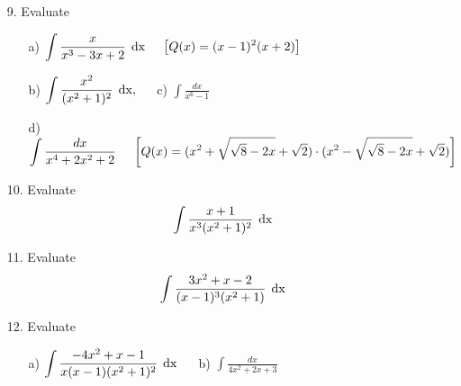 \documentclass[12pt]{article}
\begin{document}
\begin{enumerate}
\item[9.] Evaluate
	\begin{enumerate}	
	
	\item[a)] $\displaystyle
					\int
					\frac{x}
						{x^3-3x+2} \hspace*{1ex}
					\mathrm{dx}			
					\hspace*{3ex} 					        												\left[
						Q(x)=(x-1)^2(x+2)
					\right]$\\

	\item[b)] $\displaystyle
					\int
					\frac
						{x^2}{(x^2+1)^2}
					\hspace*{1ex}
					\mathrm{dx}, 	
					\hspace*{3ex}$ 
					c) 
					$ \displaystyle
				 			\int
							\frac
								{dx}{x^6-1} $\\
	
	\item[d)] $\displaystyle
					\int
					\frac
						{dx}{x^4+2x^2+2} 
					\hspace*{3ex} 
					\left[ 		
						Q(x)=
							(x^2+\sqrt{\sqrt{8}-2x}+\sqrt{2})														\cdot 							
							(x^2-\sqrt{\sqrt{8}-2x}+\sqrt{2})
					\right]$ \\
	\end{enumerate}

\item[10.] Evaluate
	 $$\displaystyle
	 		\int
	 		\frac
	 			{x+1}{x^3(x^2+1)^2}
			\hspace*{1ex}
	 		\mathrm{dx}$$

\item[11.] Evaluate
	$$\displaystyle
			\int
			\frac
				{3x^2+x-2}{(x-1)^3(x^2+1)}
			\hspace*{1ex}
			\mathrm{dx}$$
	
\item[12.] Evaluate

	\begin{enumerate}
	\item[a)] $\displaystyle
					\int
					\frac
						{-4x^2+x-1}{x(x-1)(x^2+1)^2}
					\hspace*{1ex}	
					\mathrm{dx} 
					\hspace*{3ex}$ 
					b) 
					$ \displaystyle
							\int
							\frac
								{dx}{4x^2+2x+3}$
	\end{enumerate}
	

\end{enumerate}
\end{document}
